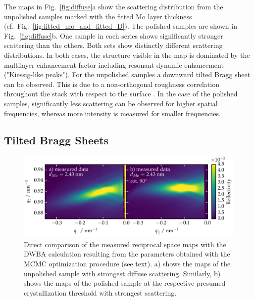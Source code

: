 The maps in Fig.~\ref{fig:diffuse}a show the scattering distribution from the unpolished samples marked with the fitted Mo layer thickness (cf.~Fig.~\ref{fig:fitted_mo_and_fitted_D}). The polished samples are shown in Fig.~\ref{fig:diffuse}b. One sample in each series shows significantly stronger scattering than the others. Both sets show distinctly different scattering distributions. In both cases, the structure visible in the map is dominated by the multilayer-enhancement factor including resonant dynamic enhancement ("Kiessig-like peaks")\cite{haase_role_2014}. For the unpolished samples a downward tilted Bragg sheet can be observed. This is due to a non-orthogonal roughness correlation throughout the stack with respect to the surface \cite{gullikson_asymmetric_1999}. In the case of the polished samples, significantly less scattering can be observed for higher spatial frequencies, whereas more intensity is measured for smaller frequencies.


\subsection{Tilted Bragg Sheets}
\begin{figure}[htbp]
\centering
\includegraphics[width=\textwidth]{img/MoSiC_diffuse_tilt_vs_notilt}
\caption{Direct comparison of the measured reciprocal space maps with the DWBA calculation resulting from the parameters obtained with the MCMC optimization procedure (see text). a) shows the maps of the unpolished sample with strongest diffuse scattering. Similarly, b) shows the maps of the polished sample at the respective presumed crystallization threshold with strongest scattering.}
\label{fig:dwba_data_best_model_comparison}
\end{figure}
